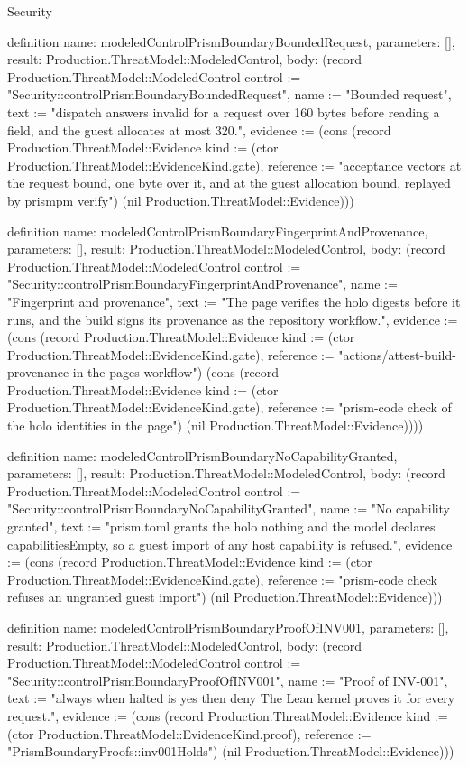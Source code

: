 \begin{lexlean}{Security}
\begin{semanticmodule}
definition{
  name: modeledControlPrismBoundaryBoundedRequest,
  parameters: [],
  result: Production.ThreatModel::ModeledControl,
  body: (record Production.ThreatModel::ModeledControl {control := "Security::controlPrismBoundaryBoundedRequest", name := "Bounded request", text := "dispatch answers invalid for a request over 160 bytes before reading a field, and the guest allocates at most 320.", evidence := (cons (record Production.ThreatModel::Evidence {kind := (ctor Production.ThreatModel::EvidenceKind.gate), reference := "acceptance vectors at the request bound, one byte over it, and at the guest allocation bound, replayed by prismpm verify"}) (nil Production.ThreatModel::Evidence))})
}

definition{
  name: modeledControlPrismBoundaryFingerprintAndProvenance,
  parameters: [],
  result: Production.ThreatModel::ModeledControl,
  body: (record Production.ThreatModel::ModeledControl {control := "Security::controlPrismBoundaryFingerprintAndProvenance", name := "Fingerprint and provenance", text := "The page verifies the holo digests before it runs, and the build signs its provenance as the repository workflow.", evidence := (cons (record Production.ThreatModel::Evidence {kind := (ctor Production.ThreatModel::EvidenceKind.gate), reference := "actions/attest-build-provenance in the pages workflow"}) (cons (record Production.ThreatModel::Evidence {kind := (ctor Production.ThreatModel::EvidenceKind.gate), reference := "prism-code check of the holo identities in the page"}) (nil Production.ThreatModel::Evidence)))})
}

definition{
  name: modeledControlPrismBoundaryNoCapabilityGranted,
  parameters: [],
  result: Production.ThreatModel::ModeledControl,
  body: (record Production.ThreatModel::ModeledControl {control := "Security::controlPrismBoundaryNoCapabilityGranted", name := "No capability granted", text := "prism.toml grants the holo nothing and the model declares capabilitiesEmpty, so a guest import of any host capability is refused.", evidence := (cons (record Production.ThreatModel::Evidence {kind := (ctor Production.ThreatModel::EvidenceKind.gate), reference := "prism-code check refuses an ungranted guest import"}) (nil Production.ThreatModel::Evidence))})
}

definition{
  name: modeledControlPrismBoundaryProofOfINV001,
  parameters: [],
  result: Production.ThreatModel::ModeledControl,
  body: (record Production.ThreatModel::ModeledControl {control := "Security::controlPrismBoundaryProofOfINV001", name := "Proof of INV-001", text := "always when halted is yes then deny The Lean kernel proves it for every request.", evidence := (cons (record Production.ThreatModel::Evidence {kind := (ctor Production.ThreatModel::EvidenceKind.proof), reference := "PrismBoundaryProofs::inv001Holds"}) (nil Production.ThreatModel::Evidence))})
}


\end{semanticmodule}
\end{lexlean}
